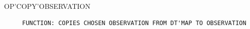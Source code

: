 \begin{frame}
OP'COPY'OBSERVATION
\begin{verbatim}
     FUNCTION: COPIES CHOSEN OBSERVATION FROM DT'MAP TO OBSERVATION




\end{verbatim}
\end{frame}

